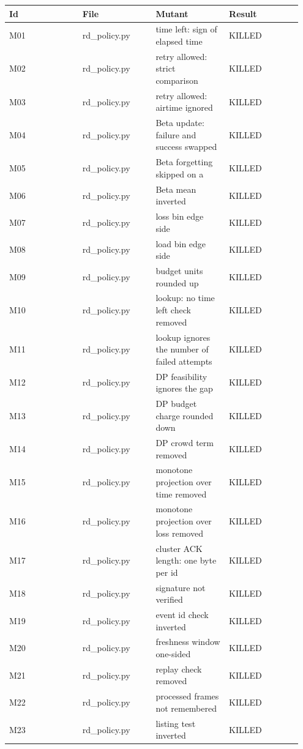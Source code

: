{\scriptsize\raggedright
\begin{longtable}{p{0.237\linewidth}p{0.237\linewidth}p{0.237\linewidth}p{0.237\linewidth}}
\toprule
Id & File & Mutant & Result \\
\midrule
\endhead
M01 & rd\_policy.py & time left: sign of elapsed time & KILLED \\
M02 & rd\_policy.py & retry allowed: strict comparison & KILLED \\
M03 & rd\_policy.py & retry allowed: airtime ignored & KILLED \\
M04 & rd\_policy.py & Beta update: failure and success swapped & KILLED \\
M05 & rd\_policy.py & Beta forgetting skipped on a & KILLED \\
M06 & rd\_policy.py & Beta mean inverted & KILLED \\
M07 & rd\_policy.py & loss bin edge side & KILLED \\
M08 & rd\_policy.py & load bin edge side & KILLED \\
M09 & rd\_policy.py & budget units rounded up & KILLED \\
M10 & rd\_policy.py & lookup: no time left check removed & KILLED \\
M11 & rd\_policy.py & lookup ignores the number of failed attempts & KILLED \\
M12 & rd\_policy.py & DP feasibility ignores the gap & KILLED \\
M13 & rd\_policy.py & DP budget charge rounded down & KILLED \\
M14 & rd\_policy.py & DP crowd term removed & KILLED \\
M15 & rd\_policy.py & monotone projection over time removed & KILLED \\
M16 & rd\_policy.py & monotone projection over loss removed & KILLED \\
M17 & rd\_policy.py & cluster ACK length: one byte per id & KILLED \\
M18 & rd\_policy.py & signature not verified & KILLED \\
M19 & rd\_policy.py & event id check inverted & KILLED \\
M20 & rd\_policy.py & freshness window one-sided & KILLED \\
M21 & rd\_policy.py & replay check removed & KILLED \\
M22 & rd\_policy.py & processed frames not remembered & KILLED \\
M23 & rd\_policy.py & listing test inverted & KILLED \\

\end{longtable}}
